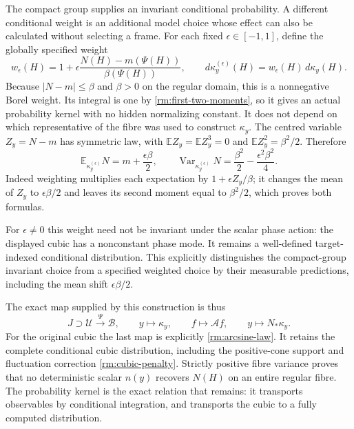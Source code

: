 The compact group supplies an invariant conditional probability. A
different conditional weight is an additional model choice whose
effect can also be calculated without selecting a frame. For each
fixed $\epsilon\in[-1,1]$, define the globally specified weight
\begin{equation}\label{rm:weighted-family}
 w_\epsilon(H)=1+\epsilon
       \frac{N(H)-m(\Psi(H))}{\beta(\Psi(H))},\qquad
 d\kappa_y^{(\epsilon)}(H)=w_\epsilon(H)\,d\kappa_y(H).
\end{equation}
Because $|N-m|\leq\beta$ and $\beta>0$ on the regular domain,
this is a nonnegative Borel weight. Its integral is one by
\eqref{rm:first-two-moments}, so it gives an actual probability
kernel with no hidden normalizing constant. It does not depend on
which representative of the fibre was used to construct $\kappa_y$.
The centred variable $Z_y=N-m$ has symmetric law, with
$\mathbb E Z_y=\mathbb E Z_y^3=0$ and
$\mathbb E Z_y^2=\beta^2/2$. Therefore
\begin{equation}\label{rm:weighted-moments}
 \mathbb E_{\kappa_y^{(\epsilon)}}N=m+\frac{\epsilon\beta}{2},
 \qquad
 \operatorname{Var}_{\kappa_y^{(\epsilon)}}N
       =\frac{\beta^2}{2}-\frac{\epsilon^2\beta^2}{4}.
\end{equation}
Indeed weighting multiplies each expectation by
$1+\epsilon Z_y/\beta$; it changes the mean of $Z_y$ to
$\epsilon\beta/2$ and leaves its second moment equal to
$\beta^2/2$, which proves both formulas.

For $\epsilon\ne0$ this weight need not be invariant under the scalar
phase action: the displayed cubic has a nonconstant phase mode.
It remains a well-defined target-indexed conditional distribution.
This explicitly distinguishes the compact-group invariant choice
from a specified weighted choice by their measurable predictions,
including the mean shift $\epsilon\beta/2$.

The exact map supplied by this construction is thus
\[
 J\supset\mathcal U\xrightarrow{\Psi}\mathcal B,
 \qquad y\longmapsto\kappa_y,
 \qquad f\longmapsto\mathcal A f,
 \qquad y\longmapsto N_*\kappa_y.
\]
For the original cubic the last map is explicitly
\eqref{rm:arcsine-law}. It retains the complete conditional cubic
distribution, including the positive-cone support and fluctuation
correction \eqref{rm:cubic-penalty}. Strictly positive fibre variance
proves that no deterministic scalar $n(y)$ recovers $N(H)$ on an
entire regular fibre. The probability kernel is the exact relation
that remains: it transports observables by conditional integration,
and transports the cubic to a fully computed distribution.
